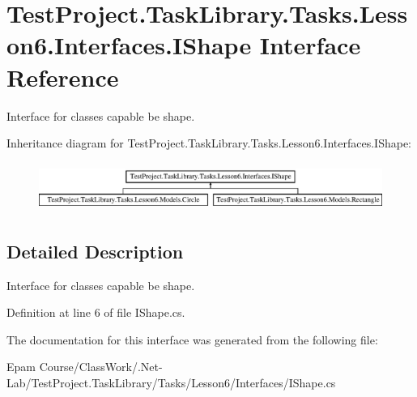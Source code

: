 \hypertarget{interface_test_project_1_1_task_library_1_1_tasks_1_1_lesson6_1_1_interfaces_1_1_i_shape}{}\section{Test\+Project.\+Task\+Library.\+Tasks.\+Lesson6.\+Interfaces.\+I\+Shape Interface Reference}
\label{interface_test_project_1_1_task_library_1_1_tasks_1_1_lesson6_1_1_interfaces_1_1_i_shape}


Interface for classes capable be shape.  


Inheritance diagram for Test\+Project.\+Task\+Library.\+Tasks.\+Lesson6.\+Interfaces.\+I\+Shape\+:\begin{figure}[H]
\begin{center}
\leavevmode
\includegraphics[height=1.618497cm]{interface_test_project_1_1_task_library_1_1_tasks_1_1_lesson6_1_1_interfaces_1_1_i_shape}
\end{center}
\end{figure}


\subsection{Detailed Description}
Interface for classes capable be shape. 



Definition at line 6 of file I\+Shape.\+cs.



The documentation for this interface was generated from the following file\+:\begin{DoxyCompactItemize}
\item 
Epam Course/\+Class\+Work/.\+Net-\/\+Lab/\+Test\+Project.\+Task\+Library/\+Tasks/\+Lesson6/\+Interfaces/I\+Shape.\+cs\end{DoxyCompactItemize}
